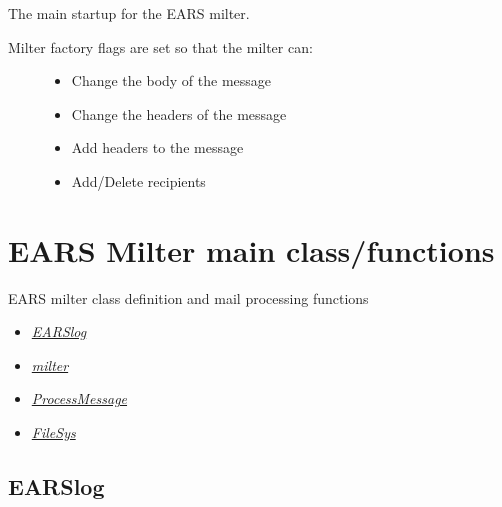 \documentclass[letterpaper,10pt,english]{sphinxmanual}
\begin{document}

\begin{fulllineitems}
\label{codedocs/EARS_py:EARS.main}
The main startup for the EARS milter.
\begin{description}
\item[{Milter factory flags are set so that the milter can:}] \leavevmode\begin{itemize}
\item {} 
Change the body of the message

\item {} 
Change the headers of the message

\item {} 
Add headers to the message

\item {} 
Add/Delete recipients

\end{itemize}

\end{description}

\end{fulllineitems}



\section{EARS Milter main class/functions}
\label{codedocs/EARSmilter:module-EARSmilter}\label{codedocs/EARSmilter:ears-milter-main-class-functions}\label{codedocs/EARSmilter::doc}
EARS milter class definition and mail processing functions
\begin{itemize}
\item {} 
{\hyperref[codedocs/EARSmilter:earslog]{\emph{EARSlog}}}

\item {} 
{\hyperref[codedocs/EARSmilter:milter]{\emph{milter}}}

\item {} 
{\hyperref[codedocs/EARSmilter:processmessage]{\emph{ProcessMessage}}}

\item {} 
{\hyperref[codedocs/EARSmilter:filesys]{\emph{FileSys}}}

\end{itemize}


\subsection{EARSlog}
\label{codedocs/EARSmilter:earslog}\label{codedocs/EARSmilter:id1}
\end{document}
